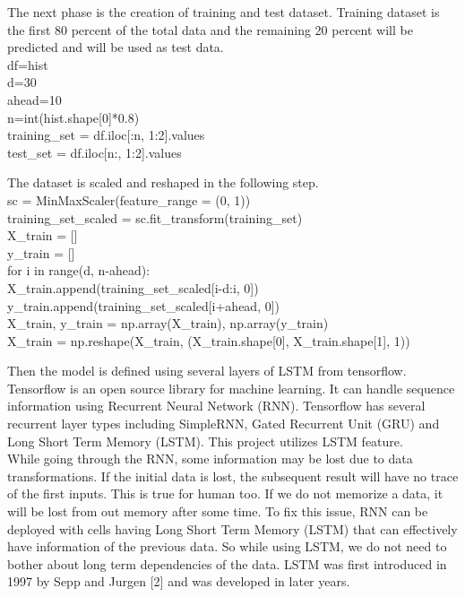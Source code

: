 \documentclass[11pt]{diazessay} %
\begin{document}
The next phase is the creation of training and test dataset. Training dataset is the first 80 percent of the total data and the remaining 20 percent will be predicted and will be used as test data.\\

{\selectfont
\noindent df=hist\\
d=30\\
ahead=10\\
n=int(hist.shape[0]*0.8)\\
training\_set = df.iloc[:n, 1:2].values\\
test\_set = df.iloc[n:, 1:2].values\\
}

The dataset is scaled and reshaped in the following step.\\

{\selectfont
\noindent sc = MinMaxScaler(feature\_range = (0, 1))\\
training\_set\_scaled = sc.fit\_transform(training\_set)\\
X\_train = []\\
y\_train = []\\
for i in range(d, n-ahead):\\
    X\_train.append(training\_set\_scaled[i-d:i, 0])\\
    y\_train.append(training\_set\_scaled[i+ahead, 0])\\
X\_train, y\_train = np.array(X\_train), np.array(y\_train)\\
X\_train = np.reshape(X\_train, (X\_train.shape[0], X\_train.shape[1], 1))\\
}

Then the model is defined using several layers of LSTM from tensorflow. Tensorflow is an open source library for machine learning. It can handle sequence information using Recurrent Neural Network (RNN).  Tensorflow has several recurrent layer types including SimpleRNN, Gated Recurrent Unit (GRU) and Long Short Term Memory (LSTM). This project utilizes LSTM feature.\\

While going through the RNN, some information may be lost due to data transformations. If the initial data is lost, the subsequent result will have no trace of the first inputs. This is true for human too. If we do not memorize a data, it will be lost from out memory after some time. To fix this issue, RNN can be deployed with cells having Long Short Term Memory (LSTM) that can effectively have information of the previous data. So while using LSTM, we do not need to bother about long term dependencies of the data. LSTM was first introduced in 1997 by Sepp and Jurgen [2] and was developed in later years. 
\end{document}
